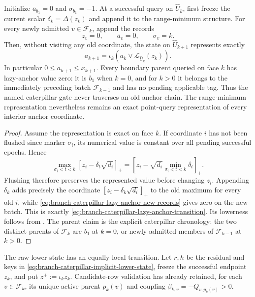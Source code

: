 \begin{lemma}
\label{lem:branch-caterpillar-lazy-anchor}
Initialize $\bar a_{b_1}=0$ and $\sigma_{b_1}=-1$.  At a successful query on
$\widehat U_k$, first freeze the current scalar $\delta_k=\Delta(z_k)$ and
append it to the range-minimum structure.  For every newly admitted
$v\in\mathcal F_k$, append the records
\begin{equation}
 z_v=0,
 \qquad \bar a_v=0,
 \qquad \sigma_v=k.
 \label{eq:branch-caterpillar-lazy-anchor-new-records}
\end{equation}
Then, without visiting any old coordinate, the state on
$\widehat U_{k+1}$ represents exactly
\begin{equation}
 a_{k+1}=\iota_k\!\left(
   a_k\vee\mathcal L_{\widehat U_k}(z_k)
                         \right).
 \label{eq:branch-caterpillar-lazy-anchor-transition}
\end{equation}
In particular $0\leq a_{k+1}\leq x_{k+1}$.  Every boundary parent queried on
face $k$ has lazy-anchor value zero: it is $b_1$ when $k=0$, and for $k>0$
it belongs to the immediately preceding batch $\mathcal F_{k-1}$ and has no
pending applicable tag.  Thus the named caterpillar gate never traverses an
old anchor chain.  The range-minimum representation nevertheless remains an
exact point-query representation of every interior anchor coordinate.
\end{lemma}

\begin{proof}
Assume the representation is exact on face $k$.  If coordinate $i$ has not
been flushed since marker $\sigma_i$, its numerical value is constant over
all pending successful epochs.  Hence
\[
 \max_{\sigma_i<t<k}
 [z_i-\delta_t\sqrt{d_i}]_+
 =[z_i-\sqrt{d_i}\min_{\sigma_i<t<k}\delta_t]_+.
\]
Flushing therefore preserves the represented value before changing $z_i$.
Appending $\delta_k$ adds precisely the coordinate
$[z_i-\delta_k\sqrt{d_i}]_+$ to the old maximum for every old $i$, while
\cref{eq:branch-caterpillar-lazy-anchor-new-records} gives zero on the new
batch.  This is exactly
\cref{eq:branch-caterpillar-lazy-anchor-transition}.  Its lowerness follows
from .  The parent claim
is the explicit caterpillar chronology: the two distinct parents of
$\mathcal F_k$ are $b_1$ at $k=0$, or newly admitted members of
$\mathcal F_{k-1}$ at $k>0$.
\end{proof}

The raw lower state has an equally local transition.  Let $r,h$ be the
residual and keys in
\cref{eq:branch-caterpillar-implicit-lower-state}, freeze the successful
endpoint $z_k$, and put $z^+:=\iota_kz_k$.  Candidate-row validation has
already retained, for each $v\in\mathcal F_k$, its unique active parent
$p_k(v)$ and coupling $\beta_{k,v}=-Q_{v,p_k(v)}>0$.

